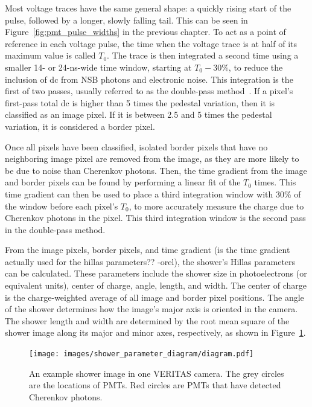 Most voltage traces have the same general shape: a quickly rising start of the pulse, followed by a longer, slowly falling tail.
This can be seen in Figure~\ref{fig:pmt_pulse_widths} in the previous chapter.
To act as a point of reference in each voltage pulse, the time when the voltage trace is at half of its maximum value is called $T_{0}$.
The trace is then integrated a second time using a smaller 14- or 24-ns-wide time window, starting at $T_0 - 30\%$, to reduce the inclusion of dc from NSB photons and electronic noise.
This integration is the first of two passes, usually referred to as the double-pass method~\cite{doublepass}.
If a pixel's first-pass total dc is higher than 5 times the pedestal variation, then it is classified as an image pixel.
If it is between 2.5 and 5 times the pedestal variation, it is considered a border pixel.

Once all pixels have been classified, isolated border pixels that have no neighboring image pixel are removed from the image, as they are more likely to be due to noise than Cherenkov photons.
Then, the time gradient from the image and border pixels can be found by performing a linear fit of the $T_{0}$ times.
This time gradient can then be used to place a third integration window 
with 30\% of the window before each pixel's $T_{0}$, to more accurately measure the charge due to Cherenkov photons in the pixel.
This third integration window is the second pass in the double-pass method.

From the image pixels, border pixels, and time gradient {\color{red}(is the time gradient actually used for the hillas parameters?? -orel)}, the shower's Hillas parameters~\cite{hillas_params} can be calculated.
These parameters include the shower size in photoelectrons (or equivalent units), center of charge, angle, length, and width.
The center of charge is the charge-weighted average of all image and border pixel positions.
The angle of the shower determines how the image's major axis is oriented in the camera.
The shower length and width are determined by the root mean square of the shower image along its major and minor axes, respectively, as shown in Figure~\ref{fig:shower_param}.
  
\begin{figure}[t]
  \centering
  \texttt{[image: images/shower\_parameter\_diagram/diagram.pdf]}
  \caption[Basic Shower Diagram]{
    An example shower image in one VERITAS camera.
    The grey circles are the locations of PMTs.
    Red circles are PMTs that have detected Cherenkov photons.
  }
  \label{fig:shower_param}
\end{figure}
\FloatBarrier


